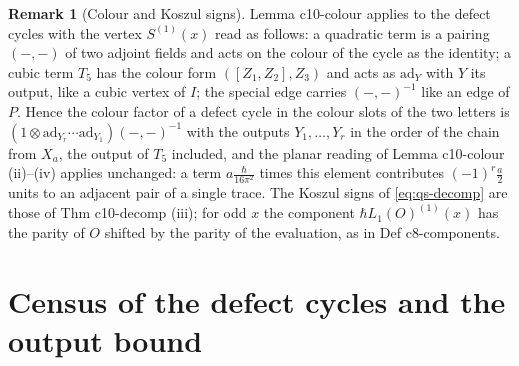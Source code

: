 \documentclass[11pt]{article}
\numberwithin{equation}{section}
\theoremstyle{plain}
\theoremstyle{definition}
\newtheorem{remark}[theorem]{Remark}
\begin{document}
\begin{remark}[Colour and Koszul signs]
\label{rem:qs-colour}
Lemma c10-colour applies to the defect cycles with the vertex $S^{(1)}(x)$ read as follows: a quadratic term is a pairing $(-,-)$ of two adjoint fields and acts on the colour of the cycle as the identity; a cubic term $T_5$ has the colour form $([Z_1,Z_2],Z_3)$ and acts as $\mathrm{ad}_Y$ with $Y$ its output, like a cubic vertex of $I$; the special edge carries $(-,-)^{-1}$ like an edge of $P$. Hence the colour factor of a defect cycle in the colour slots of the two letters is $(1\otimes\mathrm{ad}_{Y_r}\cdots\mathrm{ad}_{Y_1})(-,-)^{-1}$ with the outputs $Y_1,\dots,Y_r$ in the order of the chain from $X_a$, the output of $T_5$ included, and the planar reading of Lemma c10-colour (ii)--(iv) applies unchanged: a term $a\frac{\hbar}{16\pi^2}$ times this element contributes $(-1)^r\tfrac a2$ units to an adjacent pair of a single trace. The Koszul signs of \eqref{eq:qs-decomp} are those of Thm c10-decomp (iii); for odd $x$ the component $\hbar L_1(O)^{(1)}(x)$ has the parity of $O$ shifted by the parity of the evaluation, as in Def c8-components.
\end{remark}

\section{Census of the defect cycles and the output bound}
\label{sec:qs-census}
\end{document}
